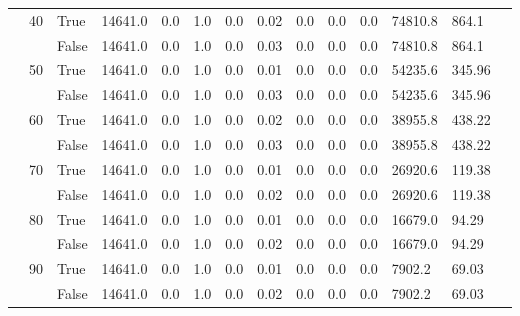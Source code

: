 \begin{landscape}
\begin{small}
\begin{longtable}[c]{@{}lll|ll|ll|ll|ll|lll@{}}
   & 40 & True  & 14641.0         & 0.0            & 1.0           & 0.0           & 0.02          & 0.0           & 0.0           & 0.0           & 74810.8       & 864.1       &  \\
   &    & False & 14641.0         & 0.0            & 1.0           & 0.0           & 0.03          & 0.0           & 0.0           & 0.0           & 74810.8       & 864.1       &  \\
   & 50 & True  & 14641.0         & 0.0            & 1.0           & 0.0           & 0.01          & 0.0           & 0.0           & 0.0           & 54235.6       & 345.96      &  \\
   &    & False & 14641.0         & 0.0            & 1.0           & 0.0           & 0.03          & 0.0           & 0.0           & 0.0           & 54235.6       & 345.96      &  \\
   & 60 & True  & 14641.0         & 0.0            & 1.0           & 0.0           & 0.02          & 0.0           & 0.0           & 0.0           & 38955.8       & 438.22      &  \\
   &    & False & 14641.0         & 0.0            & 1.0           & 0.0           & 0.03          & 0.0           & 0.0           & 0.0           & 38955.8       & 438.22      &  \\
   & 70 & True  & 14641.0         & 0.0            & 1.0           & 0.0           & 0.01          & 0.0           & 0.0           & 0.0           & 26920.6       & 119.38      &  \\
   &    & False & 14641.0         & 0.0            & 1.0           & 0.0           & 0.02          & 0.0           & 0.0           & 0.0           & 26920.6       & 119.38      &  \\
   & 80 & True  & 14641.0         & 0.0            & 1.0           & 0.0           & 0.01          & 0.0           & 0.0           & 0.0           & 16679.0       & 94.29       &  \\
   &    & False & 14641.0         & 0.0            & 1.0           & 0.0           & 0.02          & 0.0           & 0.0           & 0.0           & 16679.0       & 94.29       &  \\
   & 90 & True  & 14641.0         & 0.0            & 1.0           & 0.0           & 0.01          & 0.0           & 0.0           & 0.0           & 7902.2        & 69.03       &  \\
   &    & False & 14641.0         & 0.0            & 1.0           & 0.0           & 0.02          & 0.0           & 0.0           & 0.0           & 7902.2        & 69.03       &  \\

\end{longtable}
\end{small}
\end{landscape}
